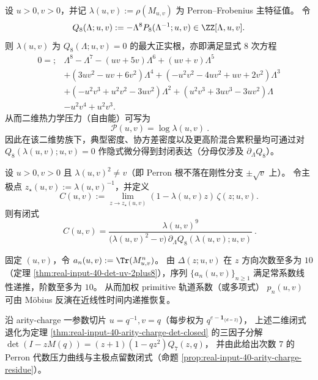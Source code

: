 \begin{proposition}\label{prop:real-input-40-zeta-uv-pressure-degree8}
设 $u>0,v>0$，并记 $\lambda(u,v):=\rho(M_{u,v})$ 为 Perron--Frobenius 主特征值。
令
\[
Q_8(\Lambda;u,v):=-\Lambda^8 P_8(\Lambda^{-1};u,v)\in\ZZ[\Lambda,u,v].
\]
则 $\lambda(u,v)$ 为 $Q_8(\Lambda;u,v)=0$ 的最大正实根，亦即满足显式 $8$ 次方程
\[
\boxed{
\begin{aligned}
0=;&\Lambda^8-\Lambda^7-(uv+5v)\Lambda^6+(uv+v)\Lambda^5\\
&+(3uv^2-uv+6v^2)\Lambda^4+(-u^2v^2-4uv^2+uv+2v^2)\Lambda^3\\
&+(-u^2v^3+u^2v^2-3uv^2)\Lambda^2+(u^2v^3+3uv^3-3uv^2)\Lambda\\
&-u^2v^4+u^2v^3.
\end{aligned}}
\]
从而二维热力学压力（自由能）可写为
\[
\boxed{\ \mathcal P(u,v)=\log\lambda(u,v)\ }.
\]
因此在该二维势族下，典型密度、协方差密度以及更高阶混合累积量均可通过对 $Q_8(\lambda(u,v);u,v)=0$ 作隐式微分得到封闭表达（分母仅涉及 $\partial_\Lambda Q_8$）。
\end{proposition}

\begin{proposition}[主极点留数常数的代数闭式]\label{prop:real-input-40-zeta-uv-residue}
设 $u>0,v>0$ 且 $\lambda(u,v)^2\neq v$（即 Perron 根不落在刚性分支 $\pm\sqrt v$ 上）。
令主极点 $z_\star(u,v):=\lambda(u,v)^{-1}$，并定义
\[
C(u,v):=\lim_{z\to z_\star(u,v)}(1-\lambda(u,v)z)\,\zeta(z;u,v).
\]
则有闭式
\[
\boxed{\ C(u,v)=\frac{\lambda(u,v)^9}{\bigl(\lambda(u,v)^2-v\bigr)\,\partial_\Lambda Q_8(\lambda(u,v);u,v)}\ }.
\]
\end{proposition}

\begin{proposition}\label{prop:real-input-40-zeta-uv-recurrence}
固定 $(u,v)$，令
\(
a_n(u,v):=\Tr(M_{u,v}^n)
\)。
由 $\Delta(z;u,v)$ 在 $z$ 方向次数至多为 $10$（定理 \ref{thm:real-input-40-det-uv-2plus8}），序列 $\{a_n(u,v)\}_{n\ge 1}$ 满足常系数线性递推，阶数至多为 $10$。
从而加权 primitive 轨道系数（或多项式）
\(
p_n(u,v)
\)
可由 Möbius 反演在近线性时间内递推恢复。
\end{proposition}

\begin{remark}\label{rem:real-input-40-zeta-uv-chi-specialization}
沿 arity-charge 一参数切片 $u=q^{-1},v=q$（每步权为 $q^{e-\mathbf{1}_{\{d=2\}}}$），
上述二维闭式退化为定理 \ref{thm:real-input-40-arity-charge-det-closed} 的三因子分解
\(
\det(I-zM(q))=(z+1)(1-qz^2)Q_7(z,q)
\)，
并由此给出次数 $7$ 的 Perron 代数压力曲线与主极点留数闭式（命题 \ref{prop:real-input-40-arity-charge-residue}）。
\end{remark}
